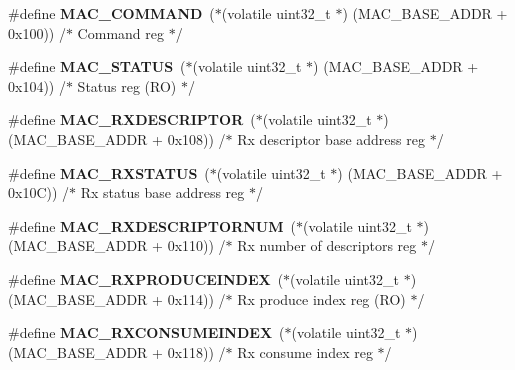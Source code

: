 \begin{DoxyCompactItemize}
\mbox{\label{group__lpc24xx__regs_ga1dd1f5f6c5879b380a286ddb33e1a5d8}} 
\#define {\bfseries M\+A\+C\+\_\+\+C\+O\+M\+M\+A\+ND}~($\ast$(volatile uint32\+\_\+t $\ast$) (M\+A\+C\+\_\+\+B\+A\+S\+E\+\_\+\+A\+D\+DR + 0x100)) /$\ast$ Command reg $\ast$/
\item 
\mbox{\label{group__lpc24xx__regs_gad85b4055a46617cdba06841ba5ee5b4b}} 
\#define {\bfseries M\+A\+C\+\_\+\+S\+T\+A\+T\+US}~($\ast$(volatile uint32\+\_\+t $\ast$) (M\+A\+C\+\_\+\+B\+A\+S\+E\+\_\+\+A\+D\+DR + 0x104)) /$\ast$ Status reg (\+R\+O) $\ast$/
\item 
\mbox{\label{group__lpc24xx__regs_ga1710e13b487e9832d98a492577d5dc2d}} 
\#define {\bfseries M\+A\+C\+\_\+\+R\+X\+D\+E\+S\+C\+R\+I\+P\+T\+OR}~($\ast$(volatile uint32\+\_\+t $\ast$) (M\+A\+C\+\_\+\+B\+A\+S\+E\+\_\+\+A\+D\+DR + 0x108)) /$\ast$ Rx descriptor base address reg $\ast$/
\item 
\mbox{\label{group__lpc24xx__regs_ga88042adce51911fcb3a4654bd19eeff0}} 
\#define {\bfseries M\+A\+C\+\_\+\+R\+X\+S\+T\+A\+T\+US}~($\ast$(volatile uint32\+\_\+t $\ast$) (M\+A\+C\+\_\+\+B\+A\+S\+E\+\_\+\+A\+D\+DR + 0x10\+C)) /$\ast$ Rx status base address reg $\ast$/
\item 
\mbox{\label{group__lpc24xx__regs_gaeac15724ffb42399147e0d6adb81a6b9}} 
\#define {\bfseries M\+A\+C\+\_\+\+R\+X\+D\+E\+S\+C\+R\+I\+P\+T\+O\+R\+N\+UM}~($\ast$(volatile uint32\+\_\+t $\ast$) (M\+A\+C\+\_\+\+B\+A\+S\+E\+\_\+\+A\+D\+DR + 0x110)) /$\ast$ Rx number of descriptors reg $\ast$/
\item 
\mbox{\label{group__lpc24xx__regs_ga6824a71c7c59f344bc934cec82095d10}} 
\#define {\bfseries M\+A\+C\+\_\+\+R\+X\+P\+R\+O\+D\+U\+C\+E\+I\+N\+D\+EX}~($\ast$(volatile uint32\+\_\+t $\ast$) (M\+A\+C\+\_\+\+B\+A\+S\+E\+\_\+\+A\+D\+DR + 0x114)) /$\ast$ Rx produce index reg (\+R\+O) $\ast$/
\item 
\mbox{\label{group__lpc24xx__regs_ga9511e6d210d37dd7aa4d967972c07ab6}} 
\#define {\bfseries M\+A\+C\+\_\+\+R\+X\+C\+O\+N\+S\+U\+M\+E\+I\+N\+D\+EX}~($\ast$(volatile uint32\+\_\+t $\ast$) (M\+A\+C\+\_\+\+B\+A\+S\+E\+\_\+\+A\+D\+DR + 0x118)) /$\ast$ Rx consume index reg $\ast$/

\end{DoxyCompactItemize}

